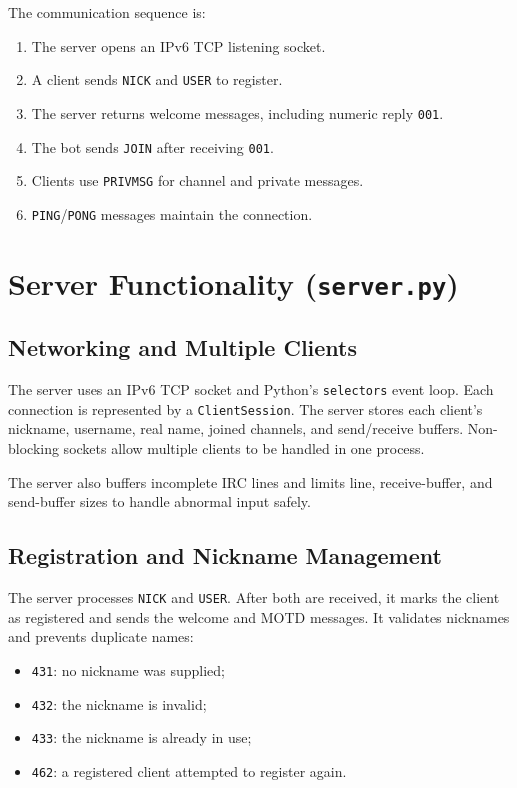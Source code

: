 \documentclass[a4paper,12pt]{article}
\begin{document}
The communication sequence is:

\begin{enumerate}
    \item The server opens an IPv6 TCP listening socket.
    \item A client sends \texttt{NICK} and \texttt{USER} to register.
    \item The server returns welcome messages, including numeric reply \texttt{001}.
    \item The bot sends \texttt{JOIN} after receiving \texttt{001}.
    \item Clients use \texttt{PRIVMSG} for channel and private messages.
    \item \texttt{PING}/\texttt{PONG} messages maintain the connection.
\end{enumerate}

\section{Server Functionality (\texttt{server.py})}

\subsection{Networking and Multiple Clients}

The server uses an IPv6 TCP socket and Python's \texttt{selectors} event loop. Each connection is represented by a \texttt{ClientSession}. The server stores each client's nickname, username, real name, joined channels, and send/receive buffers. Non-blocking sockets allow multiple clients to be handled in one process.

The server also buffers incomplete IRC lines and limits line, receive-buffer, and send-buffer sizes to handle abnormal input safely.

\subsection{Registration and Nickname Management}

The server processes \texttt{NICK} and \texttt{USER}. After both are received, it marks the client as registered and sends the welcome and MOTD messages. It validates nicknames and prevents duplicate names:

\begin{itemize}
    \item \texttt{431}: no nickname was supplied;
    \item \texttt{432}: the nickname is invalid;
    \item \texttt{433}: the nickname is already in use;
    \item \texttt{462}: a registered client attempted to register again.
\end{itemize}
\end{document}
